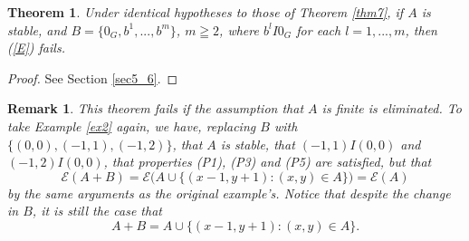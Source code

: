 \documentclass[pdflatex,sn-apa,11pt]{sn-jnl}%
\newtheorem{theorem}{Theorem}%
\newtheorem{remark}{Remark}%
\begin{document}
\begin{theorem}
\label{thm8}
Under identical hypotheses to those of Theorem \ref{thm7}, if $A$ is stable, and $B = \{0_{G}, b^{1}, ..., b^{m}\}$, $m \geqq 2$, where $b^{l}I0_{G}$ for each $l = 1, ..., m$, then (\ref{E}) fails.
\end{theorem}

\begin{proof}
See Section \ref{sec5_6}.
\end{proof}

\begin{remark}
\label{rem_thm8}
This theorem fails if the assumption that $A$ is finite is eliminated. To take Example \ref{ex2} again, we have, replacing $B$ with $\{(0, 0), (-1, 1), (-1, 2)\}$, that $A$ is stable, that $(-1, 1)I(0, 0)$ and $(-1, 2)I(0, 0)$, that properties (P1), (P3) and (P5) are satisfied, but that \begin{equation*}\mathscr{E}(A+B) = \mathscr{E}\biggl(A \cup \{(x-1, y+1): (x, y) \in A\}\biggr) = \mathscr{E}(A)\end{equation*}
by the same arguments as the original example's. Notice that despite the change in $B$, it is still the case that \begin{equation*}A+B = A \cup \{(x-1, y+1): (x, y) \in A\}.\end{equation*}
\end{remark}
\end{document}

